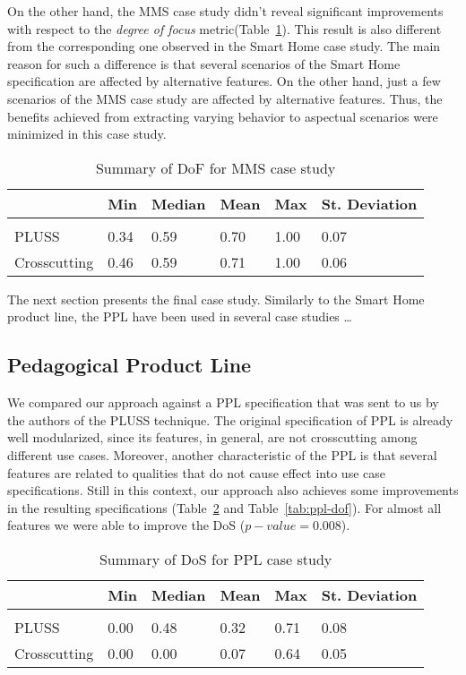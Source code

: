 On the other hand, the MMS case study didn't reveal significant improvements with
respect to the \emph{degree of focus} metric(Table~\ref{tab:mms-dof}). This
result is also different from the corresponding one observed in the Smart Home
case study. The main reason for such a difference is that several scenarios of
the Smart Home specification are affected by alternative features. On the other
hand, just a few scenarios of the MMS case study are affected by alternative
features. Thus, the benefits achieved from extracting varying behavior to
aspectual scenarios were minimized in this case study.

\begin{table}[htb] \centering
\caption{Summary of DoF for MMS case study}
\label{tab:mms-dof}
\begin{small}
\begin{tabular}{llllll} \hline
					& Min 	& Median 	& Mean 	& Max 	& St. Deviation \\ \hline \\
	PLUSS			& 0.34	& 0.59		& 0.70	& 1.00	& 0.07			\\
	Crosscutting	& 0.46  & 0.59   	& 0.71 	& 1.00 	& 0.06			\\ \hline	
\end{tabular}
\end{small}
\end{table}

The next section presents the final case study. Similarly to the Smart Home
product line, the PPL have been used in several case studies \ldots

\subsection{Pedagogical Product Line}

We compared our approach against a PPL specification that was sent to us by the authors of the PLUSS technique. The original specification of PPL is already well modularized, since its features, in general, are not crosscutting among different use cases. Moreover, another characteristic of the PPL is that several features are related to qualities that do not cause effect into use case specifications. Still in this context, our approach also achieves some improvements in the resulting specifications (Table~\ref{tab:ppl-dos} and Table~\ref{tab:ppl-dof}). For almost all features we were able to improve the DoS ($p-value=0.008$).  

\begin{table}[htb] \centering
\caption{Summary of DoS for PPL case study}
\label{tab:ppl-dos}
\begin{small}
\begin{tabular}{llllll} \hline
					& Min 	& Median 	& Mean 	& Max 	& St. Deviation \\ \hline \\
	PLUSS			& 0.00	& 0.48		& 0.32	& 0.71	& 0.08			\\
	Crosscutting	& 0.00  & 0.00   	& 0.07 	& 0.64 	& 0.05			\\ \hline	
\end{tabular}
\end{small}
\end{table}


